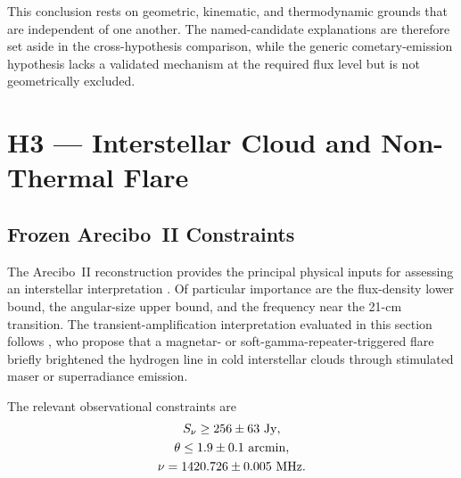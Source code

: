 \documentclass[twocolumn]{aastex701}
\newcommand{\snu}{S_\nu}
\begin{document}
This conclusion rests on geometric, kinematic, and thermodynamic grounds that are independent of one another. The named-candidate explanations are therefore set aside in the cross-hypothesis comparison, while the generic cometary-emission hypothesis lacks a validated mechanism at the required flux level but is not geometrically excluded.


\section{H3 --- Interstellar  Cloud and Non-Thermal Flare}
\label{sec:h3}

\subsection{Frozen Arecibo~II Constraints}

The Arecibo~II reconstruction provides the principal physical inputs for assessing an interstellar  interpretation \citep{mendez2025}. Of particular importance are the flux-density lower bound, the angular-size upper bound, and the frequency near the 21-cm transition. The transient-amplification interpretation evaluated in this section follows \citet{mendez2024}, who propose that a magnetar- or soft-gamma-repeater-triggered flare briefly brightened the hydrogen line in cold interstellar clouds through stimulated maser or superradiance emission.

The relevant observational constraints are
\begin{gather}
\snu\geq256\pm63~{\rm Jy},\nonumber\\
\theta\leq1.9\pm0.1~{\rm arcmin},\nonumber\\
\nu=1420.726\pm0.005~{\rm MHz}.
\end{gather}
\end{document}
